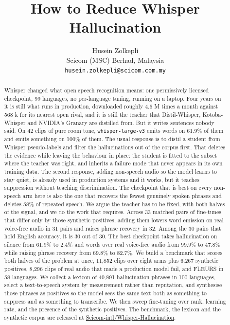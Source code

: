 \documentclass[preprint]{article}
\title{How to Reduce Whisper Hallucination}
\author{
  Husein Zolkepli \\
  Scicom (MSC) Berhad, Malaysia \\
  \texttt{husein.zolkepli@scicom.com.my}
}
\begin{document}
\maketitle

\begin{abstract}
Whisper changed what open speech recognition means: one permissively licensed checkpoint, 99
languages, no per-language tuning, running on a laptop. Four years on it is still what runs in
production, downloaded roughly 4.6 M times a month against 568 k for its nearest open rival,
and it is still the teacher that Distil-Whisper, Kotoba-Whisper and NVIDIA's Granary are
distilled from. But it writes sentences nobody said. On 42 clips of pure room tone, \texttt{whisper-large-v3}
emits words on 61.9\% of them and emits something on 100\% of them. The usual response is to
distil a student from Whisper pseudo-labels and filter the hallucinations out of the corpus
first. That deletes the evidence while leaving the behaviour in place: the student is fitted to the
subset where the teacher was right, and inherits a failure mode that never appears in its own
training data. The second response, adding non-speech audio so the model learns to stay quiet, is
already used in production systems and it works, but it teaches suppression without teaching
discrimination. The checkpoint that is best on every non-speech arm here is also the one that
recovers the fewest genuinely spoken phrases and deletes 58\% of repeated speech. We argue the teacher has to be fixed, with both halves of the signal, and we do the work that
requires. Across 33 matched pairs of fine-tunes that differ only by those synthetic positives, adding
them lowers word emission on real voice-free audio in 31 pairs and raises phrase recovery in
32. Among the 30 pairs that hold English accuracy, it is 30 out of 30. The best checkpoint
takes hallucination on silence from 61.9\% to 2.4\% and words over real voice-free audio from
99.9\% to 47.8\% while raising phrase recovery from 69.8\% to 82.7\%. We build a
benchmark that scores both halves of the problem at once, 11,852 clips over eight arms plus
6,267 synthetic positives, 8,296 clips of real audio that made a production model fail, and
FLEURS in 58 languages. We collect a lexicon of 40,891 hallucination phrases in 100 languages,
select a text-to-speech system by measurement rather than reputation, and synthesise those
phrases as positives so the model sees the same text both as something to suppress and as
something to transcribe. We then sweep fine-tuning over rank, learning rate, and the presence
of the synthetic positives. The benchmark, the lexicon and the synthetic corpus are released at
\href{https://huggingface.co/datasets/Scicom-intl/Whisper-Hallucination}{Scicom-intl/Whisper-Hallucination}.
\end{abstract}
\end{document}
